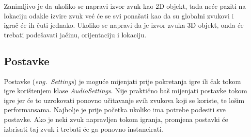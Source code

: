 Zanimljivo je da ukoliko se napravi izvor zvuk kao 2D objekt, tada neće paziti na lokaciju odakle izvire zvuk već će se svi ponašati kao da su globalni zvukovi i igrač će ih čuti jednako. Ukoliko se napravi da je izvor zvuka 3D objekt, onda će trebati podešavati jačinu, orijentaciju i lokaciju.

\subsection{Postavke}
Postavke (\emph{eng.~Settings}) je moguće mijenjati prije pokretanja igre ili čak tokom igre korištenjem klase \emph{AudioSettings}. Nije praktično baš mijenjati postavke tokom igre jer će to uzrokovati ponovno učitavanje svih zvukova koji se koriste, te lošim performansama. Najbolje je prije početka ukoliko ima potrebe podesiti sve postavke. Ako je neki zvuk napravljen tokom igranja, promjena postavki će izbrisati taj zvuk i trebati će ga ponovno instancirati.